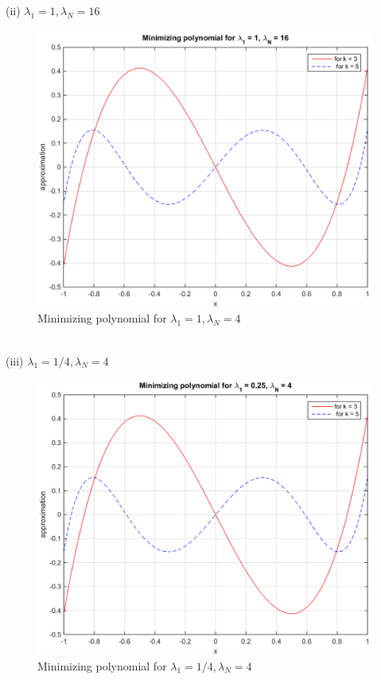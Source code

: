 \documentclass[14pt,a4paper]{article}
\begin{document}
\begin{enumerate}
	(ii) $\lambda_1 = 1, \lambda_N = 16$
	\begin{figure}[htp]
		\centering
		\includegraphics[scale=0.58]{hw3_4116.png}
		\caption{Minimizing polynomial for $\lambda_1 = 1, \lambda_N = 4$}
	\end{figure}\\
	(iii) $\lambda_1 = 1/4, \lambda_N = 4$
	\begin{figure}[htp]
		\centering
		\includegraphics[scale=0.58]{hw3_43.png}
		\caption{Minimizing polynomial for $\lambda_1 = 1/4, \lambda_N = 4$}
	\end{figure}
	

\end{enumerate}
\end{document}
